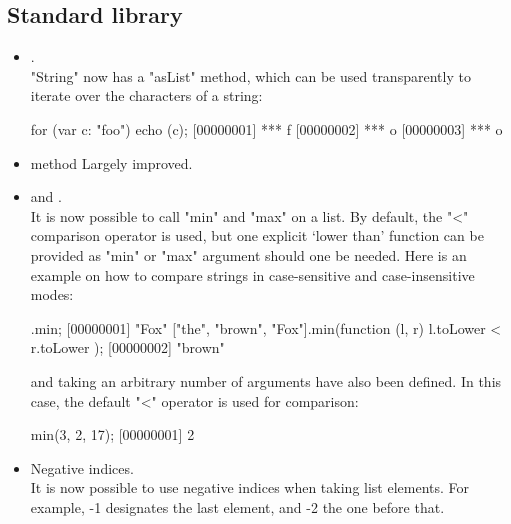 \subsection{Standard library}
\begin{itemize}
\item {}.\\
  "String" now has a "asList" method, which can be used transparently to
  iterate over the characters of a string:

\begin{urbiscript}
for (var c: "foo") echo (c);
[00000001] *** f
[00000002] *** o
[00000003] *** o
\end{urbiscript}

\item {} method Largely improved.

\item {} and .\\
  It is now possible to call "min" and "max" on a list. By default, the "<"
  comparison operator is used, but one explicit `lower than' function can be
  provided as "min" or "max" argument should one be needed. Here is an
  example on how to compare strings in case-sensitive and case-insensitive
  modes:

\begin{urbiscript}
.min;
[00000001] "Fox"
["the", "brown", "Fox"].min(function (l, r) { l.toLower < r.toLower });
[00000002] "brown"
\end{urbiscript}

   and  taking an arbitrary number of
  arguments have also been defined. In this case, the default "<" operator
  is used for comparison:

\begin{urbiscript}
min(3, 2, 17);
[00000001] 2
\end{urbiscript}

\item Negative indices.\\
  It is now possible to use negative indices when taking list elements.  For
  example, -1 designates the last element, and -2 the one before that.


\end{itemize}
